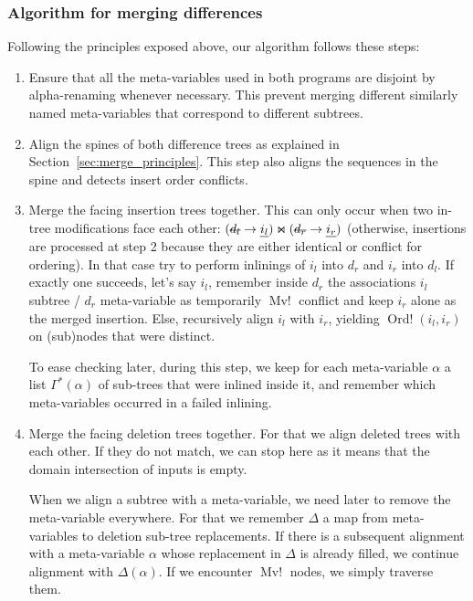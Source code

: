 \documentclass[a4paper,11pt]{article}
\newcommand\merge{\mathbin{\Join}}
\newcommand\mathst[1]{\text{\st{$#1$}}}
\newcommand\mathul[1]{\text{\ul{$#1$}}}
\newcommand\change[2]{\mathst{#1} \rightarrow \mathul{#2}}
\DeclareMathOperator\OrdConflict{Ord!}
\DeclareMathOperator\MvConflict{Mv!}
\newcommand\gb[1]{}%
\begin{document}
\subsubsection{Algorithm for merging differences}
\label{sec:syntactic_merge_algo}

\gb{Cette section reste très technique, mais je ne pense pas pouvoir y échapper...}
Following the principles exposed above, our algorithm follows these steps:
\begin{enumerate}
 \item Ensure that all the meta-variables used in both programs are
   disjoint by alpha-renaming whenever necessary. This prevent merging different similarly named meta-variables that correspond to different subtrees.

 \item Align the spines of both difference trees as explained in Section~\ref{sec:merge_principles}. This step also aligns the sequences in the spine and detects insert order conflicts.
 
 \item Merge the facing insertion trees together. This can only occur when two in-tree modifications face each other: $(\change{d_l}{i_l}) \merge (\change{d_r}{i_r})$ (otherwise, insertions are processed at step 2 because they are either identical or conflict for ordering).
 In that case try to perform inlinings of $i_l$ into $d_r$ and $i_r$ into $d_l$. If exactly one succeeds, let's say $i_l$, remember inside $d_r$ the associations $i_l$ subtree / $d_r$ meta-variable as temporarily $\MvConflict$ conflict and keep $i_r$ alone as the merged insertion. Else, recursively align $i_l$ with $i_r$, yielding $\OrdConflict(i_l, i_r)$ on (sub)nodes that were distinct.
 
 To ease checking later, during this step, we keep for each meta-variable $\alpha$ a list $\Gamma^*(\alpha)$ of sub-trees that were inlined inside it, and remember which meta-variables occurred in a failed inlining.

 \item Merge the facing deletion trees together. For that we align deleted trees with each other. If they do not match, we can stop here as it means that the domain intersection of inputs is empty. 
 
 When we align a subtree with a meta-variable, we need later to remove the meta-variable everywhere. For that we remember $\Delta$ a map from meta-variables to deletion sub-tree replacements. If there is a subsequent alignment with a meta-variable $\alpha$ whose replacement in $\Delta$ is already filled, we continue alignment with $\Delta(\alpha)$. If we encounter $\MvConflict$ nodes, we simply traverse them.


\end{enumerate}
\end{document}
